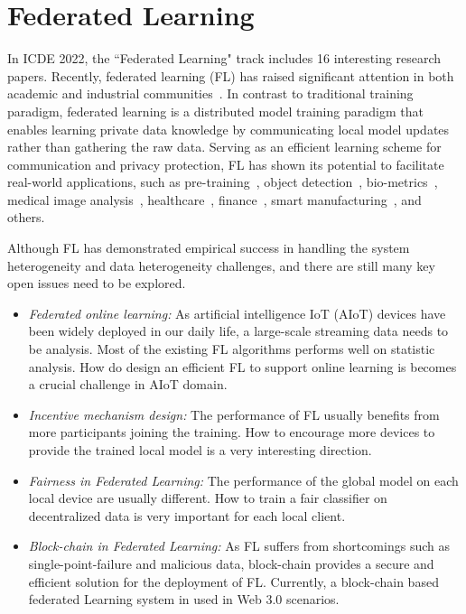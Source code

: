 \documentclass[11pt,dvipdfm]{article}
\begin{document}

\section{Federated Learning}

In ICDE 2022, the ``Federated Learning" track includes 16 interesting research papers.
Recently, federated learning (FL) has raised significant attention in both academic and industrial communities~\cite{hao2019efficient,li2020federated, nguyen2021federated}. In contrast to traditional training paradigm, federated learning is a distributed model training paradigm that enables learning private data knowledge by communicating local model updates rather than gathering the raw data. Serving as an efficient learning scheme for communication and privacy protection, FL has shown its potential to facilitate real-world applications, such as pre-training~\cite{tian2022fedbert}, object detection~\cite{liu2020fedvision}, bio-metrics~\cite{dayan2021federated}, medical image analysis~\cite{kaissis2020secure}, healthcare~\cite{xu2021federated,antunes2022federated}, finance~\cite{yang2019ffd}, smart manufacturing~\cite{hao2019efficient}, and others.

Although FL has demonstrated empirical success in handling the system heterogeneity and data heterogeneity challenges, and there are still many key open issues need to be explored.
\begin{itemize}
  \item \textit{Federated online learning:} As artificial intelligence IoT (AIoT) devices have been widely deployed in our daily life, a large-scale streaming data needs to be analysis. Most of the existing FL algorithms performs well on statistic analysis. How do design an efficient FL to support online learning is becomes a crucial challenge in AIoT domain.
  \item \textit{Incentive mechanism design:} The performance of FL usually benefits from more participants joining the training. How to encourage more devices to provide the trained local model is a very interesting direction.
  \item \textit{Fairness in Federated Learning:} The performance of the global model on each local device are usually different. How to train a fair classifier on decentralized data is very important for each local client.
  \item \textit{Block-chain in Federated Learning:} As FL suffers from shortcomings such as single-point-failure and malicious data, block-chain provides a secure and efficient solution for the deployment of FL. Currently, a block-chain based federated Learning system in used in Web 3.0 scenarios. 
\end{itemize}
\end{document}
